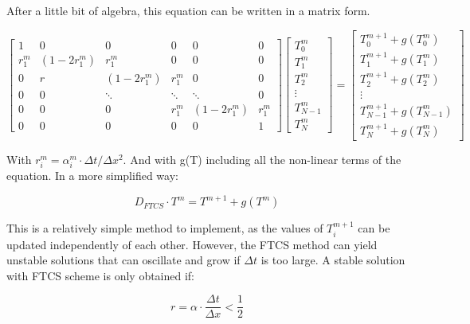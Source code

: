 After a little bit of algebra, this equation can be written in a matrix form.

$$
\begin{bmatrix}
         1 & 0 & 0 & 0 & 0 & 0 \\
         r^m_1 & \left(1-2r^m_1\right) & r^m_1 & 0 & 0 & 0 \\ 
         0 & r & \left(1-2r^m_1\right) & r^m_1 & 0 & 0 \\ 
         0 & 0 & \ddots & \ddots & \ddots & 0 \\
         0 & 0 & 0 & r^m_1 & \left(1-2r^m_1\right) & r^m_1 \\
         0 & 0 & 0 & 0 & 0 & 1 
     \end{bmatrix}
\begin{bmatrix}
         T^m_0  \\
         T^m_1 \\ 
         T^m_2  \\ 
         \vdots \\
         T^m_{N-1} \\
         T^m_N 
     \end{bmatrix}
     =
     \begin{bmatrix}
         T^{m+1}_0 + g(T^m_0) \\
         T^{m+1}_1 + g(T^m_1)\\ 
         T^{m+1}_2 + g(T^m_2)\\ 
         \vdots\\ 
         T^{m+1}_{N-1} + g(T^m_{N-1})\\
         T^{m+1}_{N} + g(T^m_{N}) 
     \end{bmatrix}
$$

With $r^m_i = \alpha^m_i \cdot \Delta t/ \Delta x^2$. And with g(T) including all the non-linear terms of the equation. In a more simplified way: 

\begin{equation}
    D_{FTCS}\cdot T^{m} = T^{m+1}+g(T^m)
\end{equation}

This is a relatively simple method to implement, as the values of $T_i^{m+1}$ can be updated independently of each other. However, the FTCS method can yield unstable solutions that can oscillate and grow if $\Delta t$ is too large. A stable solution with FTCS scheme is only obtained if: 

\begin{equation}
    r = \alpha\cdot \frac{\Delta t}{\Delta x} < \frac{1}{2}
    \label{eq:rstab}
\end{equation}

